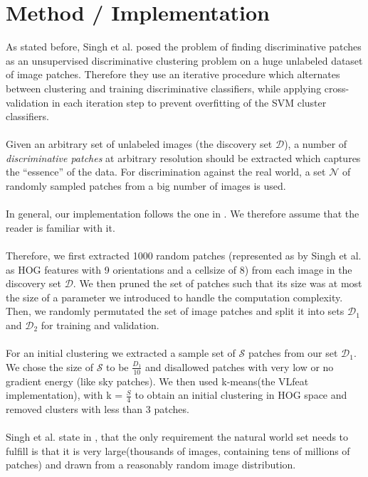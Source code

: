\section{Method / Implementation}

As stated before, Singh et al. posed the problem of finding discriminative patches as an unsupervised 
discriminative clustering problem on a huge unlabeled dataset of image patches. Therefore they use
an iterative procedure which alternates between clustering and training discriminative classifiers, while
applying cross-validation in each iteration step to prevent overfitting of the SVM cluster classifiers.\\
\\
Given an arbitrary set of unlabeled images (the discovery set $\mathcal{D}$), a number of \textit{discriminative patches}
at arbitrary resolution should be extracted which captures the ``essence'' of the data. For discrimination against
the real world, a set $\mathcal{N}$ of randomly sampled patches from a big number of images is used.\\
\\
In general, our implementation 
follows the one in \cite{Singh2012DiscPat}. We therefore assume that the reader is familiar with it.\\
\\
Therefore, we first extracted 1000 random patches (represented as by Singh et al. as HOG features with 9 orientations
and a cellsize of 8) from each image in the discovery set $\mathcal{D}$. We then pruned the set of patches such that its size
was at most the size of a parameter we introduced to handle the computation complexity. Then, we randomly permutated
the set of image patches and split it into sets $\mathcal{D_1}$ and $\mathcal{D_2}$ for training and validation. \\
\\
For an initial clustering we extracted a sample set of $\mathcal{S}$ patches from our set $\mathcal{D_1}$. We chose the size
of $\mathcal{S}$ to be $\frac{D_1}{10}$ and disallowed patches with very low or no gradient energy (like sky patches).
We then used k-means(the VLfeat implementation), with k = $\frac{S}{4}$ to obtain an initial clustering in HOG space and removed
clusters with less than 3 patches.\\
\\
Singh et al. state in \cite{Singh2012DiscPat}, that the only requirement the natural world set needs to fulfill is that
it is very large(thousands of images, containing tens of millions of patches) and drawn from a reasonably random image distribution.
